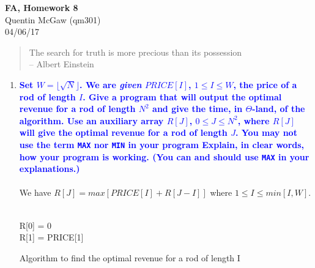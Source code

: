 \documentclass[11pt]{article}
\begin{document}
\begin{center} {\Large\bf FA, Homework 8} \\ Quentin McGaw (qm301) \\ 04/06/17
\end{center}

\begin{quote}
The search for truth is more precious than its possession
\\ --  Albert Einstein
\end{quote}

\begin{enumerate}
\item \textbf{\textcolor{blue}{Set $W=\lfloor{\sqrt{N}}\rfloor$.  
We are {\em given} $PRICE[I]$, $1\leq I\leq W$, the price of a rod of length $I$. 
Give a program that will output the optimal revenue for a rod of length $N^2$ 
and give the time, in $\Theta$-land,  of the algorithm.
Use an auxiliary array $R[J]$, $0\leq J\leq N^2$, where $R[J]$ will give the
optimal revenue for a rod of length $J$.  You may {\bf not} use
the term {\tt MAX} nor {\tt MIN} in your program  Explain, in clear words, how your program is working.
(You can and should use {\tt MAX} in your explanations.)}}
    \\\\ We have $R[J] = max[PRICE[I] + R[J-I]]$ where $1 \leq I \leq min[I, W]$. \\\\
    \begin{algorithm}[H]
        R[0] = 0 \\
        R[1] = PRICE[1] \\
        \caption{Algorithm to find the optimal revenue for a rod of length I}

\end{algorithm}
\end{enumerate}
\end{document}
